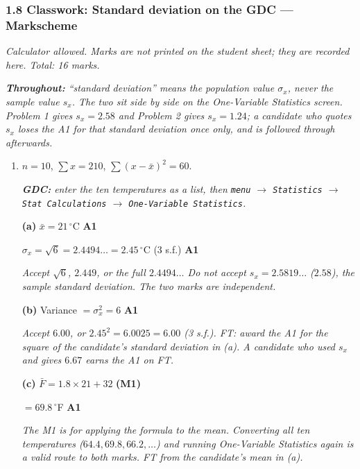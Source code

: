 \documentclass[12pt, twoside]{article}
\begin{document}
\subsubsection*{1.8 Classwork: Standard deviation on the GDC --- Markscheme}

\emph{Calculator allowed. Marks are not printed on the student sheet; they are
recorded here. Total: 16 marks.}

\emph{\textbf{Throughout:} ``standard deviation'' means the population value
$\sigma_{x}$, never the sample value $s_{x}$. The two sit side by side on the
One-Variable Statistics screen. Problem 1 gives $s_{x} = 2.58$ and Problem 2
gives $s_{x} = 1.24$; a candidate who quotes $s_{x}$ loses the A1 for that
standard deviation once only, and is followed through afterwards.}

\begin{enumerate}[itemsep=0.3cm]

\item[1.] [Maximum mark: 9]

$n = 10$, \quad $\sum x = 210$, \quad $\sum (x - \bar{x})^{2} = 60$.

\emph{\textbf{GDC:} enter the ten temperatures as a list, then
\texttt{menu} $\rightarrow$ \texttt{Statistics} $\rightarrow$ \texttt{Stat
Calculations} $\rightarrow$ \texttt{One-Variable Statistics}.}

\textbf{(a)} $\bar{x} = 21\,^{\circ}$C \hfill \textbf{A1}

$\sigma_{x} = \sqrt{6} = 2.4494\ldots = 2.45\,^{\circ}$C (3 s.f.)
\hfill \textbf{A1}

\emph{Accept $\sqrt{6}$, $2.449$, or the full $2.4494\ldots$ Do not accept
$s_{x} = 2.5819\ldots$ ($2.58$), the sample standard deviation. The two marks
are independent.}

\textbf{(b)} Variance $= \sigma_{x}^{2} = 6$ \hfill \textbf{A1}

\emph{Accept $6.00$, or $2.45^{2} = 6.0025 = 6.00$ (3 s.f.). FT: award the A1
for the square of the candidate's standard deviation in (a). A candidate who
used $s_{x}$ and gives $6.67$ earns the A1 on FT.}

\textbf{(c)} $\bar{F} = 1.8 \times 21 + 32$ \hfill \textbf{(M1)}

$= 69.8\,^{\circ}$F \hfill \textbf{A1}

\emph{The M1 is for applying the formula to the mean. Converting all ten
temperatures ($64.4, 69.8, 66.2, \ldots$) and running One-Variable
Statistics again is a valid route to both marks. FT from the candidate's mean
in (a).}


\end{enumerate}
\end{document}
